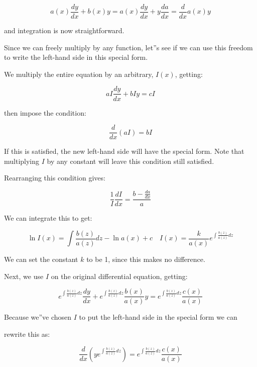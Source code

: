 $$
a(x)\frac{dy}{dx} + b(x)y = a(x)\frac{dy}{dx} + y\frac{da}{dx} = \frac{d}{dx}a(x)y
$$



and integration is now straightforward.



Since we can freely multiply by any function, let''s see if we can use this freedom to write the left-hand side in this special form.



We multiply the entire equation by an arbitrary, $I(x)$, getting:



$$aI\frac{dy}{dx} + bIy = cI$$



then impose the condition:



$$\frac{d}{dx}(aI) = bI$$



If this is satisfied, the new left-hand side will have the special form. Note that multiplying $I$ by any constant will leave this condition still satisfied.



Rearranging this condition gives:



$$\frac{1}{I}\frac{dI}{dx} = \frac{b - \frac{da}{dx}}{a}$$



We can integrate this to get:



$$\ln I(x) = \int \frac{b(z)}{a(z)}dz - \ln a(x) + c \quad
I(x) = \frac{k}{a(x)}e^{\int \frac{b(z)}{a(z)}dz}$$



We can set the constant $k$ to be 1, since this makes no difference.



Next, we use $I$ on the original differential equation, getting:



$$e^{\int \frac{b(z)}{a(z)}dz}\frac{dy}{dx} +
e^{\int \frac{b(z)}{a(z)}dz} \frac{b(x)}{a(x)}y
= e^{\int \frac{b(z)}{a(z)}dz}\frac{c(x)}{a(x)}$$



Because we''ve chosen $I$ to put the left-hand side in the special form we can

rewrite this as:



$$\frac{d}{dx}(ye^{\int \frac{b(z)}{a(z)}dz}) = 
e^{\int \frac{b(z)}{a(z)}dz}\frac{c(x)}{a(x)}$$



